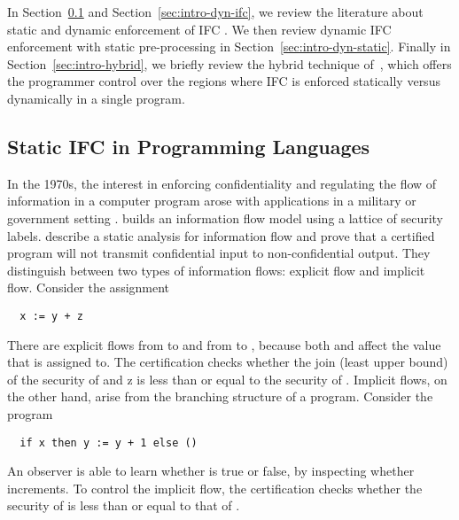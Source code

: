 In Section~\ref{sec:intro-static-ifc} and Section~\ref{sec:intro-dyn-ifc}, we
review the literature about static and dynamic enforcement of IFC . We then
review dynamic IFC enforcement with static pre-processing in
Section~\ref{sec:intro-dyn-static}. Finally in Section~\ref{sec:intro-hybrid},
we briefly review the hybrid technique of~\textcite{Buiras:2015aa}, which offers
the programmer control over the regions where IFC is enforced statically versus
dynamically in a single program.

\subsection{Static IFC in Programming Languages}
\label{sec:intro-static-ifc}

In the 1970s, the interest in enforcing confidentiality and regulating the flow
of information in a computer program arose with applications in a military or
government setting \autocite{bell1976secure,lester2016information}.
\textcite{denning1976lattice} builds an information flow model using a lattice
of security labels. \textcite{denning1977certification} describe a static
analysis for information flow and prove that a certified program will not
transmit confidential input to non-confidential output. They distinguish between
two types of information flows: explicit flow and implicit flow. Consider the
assignment
\begin{verbatim}
  x := y + z
\end{verbatim}
\noindent There are explicit flows from  to  and from  to
, because both  and  affect the value that  is
assigned to. The certification checks whether the join (least upper bound) of
the security of  and {z} is less than or equal to the security of
. Implicit flows, on the other hand, arise from the branching structure
of a program. Consider the program
\begin{verbatim}
  if x then y := y + 1 else ()
\end{verbatim}
\noindent An observer is able to learn whether  is true or false, by inspecting
whether  increments. To control the implicit flow, the certification
checks whether the security of  is less than or equal to that of .

